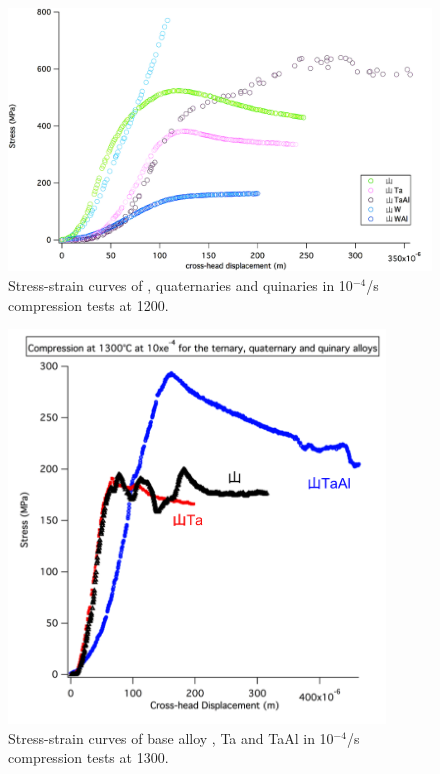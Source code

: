 %
%
\begin{figure}[H]
\begin{center}
\includegraphics[width=14cm]{1200e-4}
\caption{Stress-strain curves of , quaternaries and quinaries in 10$^{-4}$/s compression tests at 1200\celsius.}
\label{fig:1200e-4}
\end{center}
\end{figure}
%
%
\begin{figure}[H]
\begin{center}
\includegraphics[width=10cm]{sansanTasanTaAl}
\caption{Stress-strain curves of base alloy , Ta and TaAl in 10$^{-4}$/s compression tests at 1300\celsius.}
\label{fig:sansanTasanTaAl1300e-4}
\end{center}
\end{figure}
%


